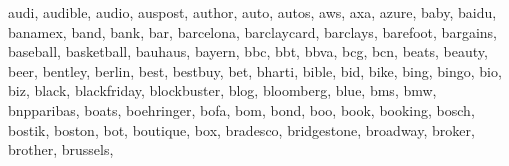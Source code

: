 \documentclass[letterpaper,10pt,english]{sphinxmanual}
\begin{document}
\begin{fulllineitems}
\begin{fulllineitems}
\textquotesingle{}audi\textquotesingle{}, \textquotesingle{}audible\textquotesingle{}, \textquotesingle{}audio\textquotesingle{}, \textquotesingle{}auspost\textquotesingle{}, \textquotesingle{}author\textquotesingle{}, \textquotesingle{}auto\textquotesingle{}, \textquotesingle{}autos\textquotesingle{}, \textquotesingle{}aws\textquotesingle{}, \textquotesingle{}axa\textquotesingle{}, \textquotesingle{}azure\textquotesingle{}, \textquotesingle{}baby\textquotesingle{}, \textquotesingle{}baidu\textquotesingle{}, \textquotesingle{}banamex\textquotesingle{}, \textquotesingle{}band\textquotesingle{}, \textquotesingle{}bank\textquotesingle{}, \textquotesingle{}bar\textquotesingle{}, \textquotesingle{}barcelona\textquotesingle{}, \textquotesingle{}barclaycard\textquotesingle{}, \textquotesingle{}barclays\textquotesingle{}, \textquotesingle{}barefoot\textquotesingle{}, \textquotesingle{}bargains\textquotesingle{}, \textquotesingle{}baseball\textquotesingle{}, \textquotesingle{}basketball\textquotesingle{}, \textquotesingle{}bauhaus\textquotesingle{}, \textquotesingle{}bayern\textquotesingle{}, \textquotesingle{}bbc\textquotesingle{}, \textquotesingle{}bbt\textquotesingle{}, \textquotesingle{}bbva\textquotesingle{}, \textquotesingle{}bcg\textquotesingle{}, \textquotesingle{}bcn\textquotesingle{}, \textquotesingle{}beats\textquotesingle{}, \textquotesingle{}beauty\textquotesingle{}, \textquotesingle{}beer\textquotesingle{}, \textquotesingle{}bentley\textquotesingle{}, \textquotesingle{}berlin\textquotesingle{}, \textquotesingle{}best\textquotesingle{}, \textquotesingle{}bestbuy\textquotesingle{}, \textquotesingle{}bet\textquotesingle{}, \textquotesingle{}bharti\textquotesingle{}, \textquotesingle{}bible\textquotesingle{}, \textquotesingle{}bid\textquotesingle{}, \textquotesingle{}bike\textquotesingle{}, \textquotesingle{}bing\textquotesingle{}, \textquotesingle{}bingo\textquotesingle{}, \textquotesingle{}bio\textquotesingle{}, \textquotesingle{}biz\textquotesingle{}, \textquotesingle{}black\textquotesingle{}, \textquotesingle{}blackfriday\textquotesingle{}, \textquotesingle{}blockbuster\textquotesingle{}, \textquotesingle{}blog\textquotesingle{}, \textquotesingle{}bloomberg\textquotesingle{}, \textquotesingle{}blue\textquotesingle{}, \textquotesingle{}bms\textquotesingle{}, \textquotesingle{}bmw\textquotesingle{}, \textquotesingle{}bnpparibas\textquotesingle{}, \textquotesingle{}boats\textquotesingle{}, \textquotesingle{}boehringer\textquotesingle{}, \textquotesingle{}bofa\textquotesingle{}, \textquotesingle{}bom\textquotesingle{}, \textquotesingle{}bond\textquotesingle{}, \textquotesingle{}boo\textquotesingle{}, \textquotesingle{}book\textquotesingle{}, \textquotesingle{}booking\textquotesingle{}, \textquotesingle{}bosch\textquotesingle{}, \textquotesingle{}bostik\textquotesingle{}, \textquotesingle{}boston\textquotesingle{}, \textquotesingle{}bot\textquotesingle{}, \textquotesingle{}boutique\textquotesingle{}, \textquotesingle{}box\textquotesingle{}, \textquotesingle{}bradesco\textquotesingle{}, \textquotesingle{}bridgestone\textquotesingle{}, \textquotesingle{}broadway\textquotesingle{}, \textquotesingle{}broker\textquotesingle{}, \textquotesingle{}brother\textquotesingle{}, \textquotesingle{}brussels\textquotesingle{}, 
\end{fulllineitems}
\end{fulllineitems}
\end{document}

